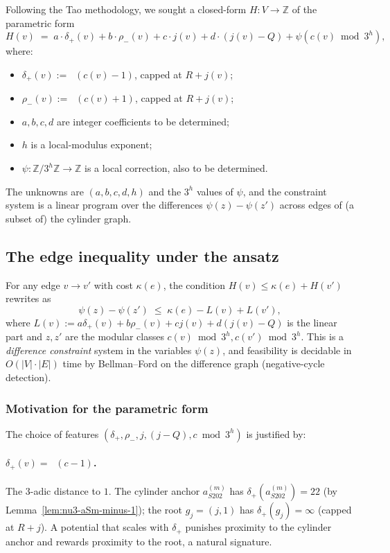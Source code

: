 \documentclass[11pt,a4paper]{article}
\theoremstyle{plain}
\theoremstyle{definition}
\newcommand{\ZZ}{\mathbb{Z}}
\newcommand{\aSat}{a_{S202}^{(m)}}
\DeclareMathOperator{\nuthree}{\nu_3}
\begin{document}
Following the Tao methodology, we sought a closed-form
$H : V \to \ZZ$ of the parametric form
\begin{equation}
\label{eq:ansatz}
  H(v)
  \;=\;
  a \cdot \delta_+(v) + b \cdot \rho_-(v)
   + c \cdot j(v) + d \cdot (j(v) - Q)
   + \psi(c(v) \bmod 3^h),
\end{equation}
where:
\begin{itemize}
  \item $\delta_+(v) := \nuthree(c(v) - 1)$, capped at $R + j(v)$;
  \item $\rho_-(v) := \nuthree(c(v) + 1)$, capped at $R + j(v)$;
  \item $a, b, c, d$ are integer coefficients to be determined;
  \item $h$ is a local-modulus exponent;
  \item $\psi : \ZZ/3^h\ZZ \to \ZZ$ is a local correction, also
        to be determined.
\end{itemize}

The unknowns are $(a, b, c, d, h)$ and the $3^h$ values of $\psi$,
and the constraint system is a linear program over the differences
$\psi(z) - \psi(z')$ across edges of (a subset of) the cylinder
graph.

\subsection{The edge inequality under the ansatz}

For any edge $v \to v'$ with cost $\kappa(e)$, the condition
$H(v) \le \kappa(e) + H(v')$ rewrites as
\[
  \psi(z) - \psi(z')
   \;\le\; \kappa(e) - L(v) + L(v'),
\]
where
$L(v) := a \delta_+(v) + b \rho_-(v) + c j(v) + d (j(v) - Q)$ is the
linear part and $z, z'$ are the modular classes
$c(v) \bmod 3^h, c(v') \bmod 3^h$. This is a
\emph{difference constraint} system in the variables $\psi(z)$, and
feasibility is decidable in $O(|V| \cdot |E|)$ time by
Bellman--Ford on the difference graph (negative-cycle detection).

\subsubsection*{Motivation for the parametric form}

The choice of features
$(\delta_+, \rho_-, j, (j - Q), c \bmod 3^h)$ is justified by:

\paragraph{$\delta_+(v) = \nuthree(c - 1)$.}
The 3-adic distance to $1$. The cylinder anchor $\aSat$ has
$\delta_+(\aSat) = 22$ (by Lemma~\ref{lem:nu3-aSm-minus-1}); the
root $g_j = (j, 1)$ has $\delta_+(g_j) = \infty$ (capped at $R + j$).
A potential that scales with $\delta_+$ punishes proximity to the
cylinder anchor and rewards proximity to the root, a natural
signature.
\end{document}
